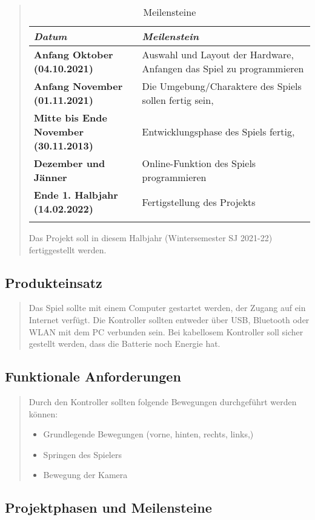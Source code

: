 \begin{quote}
\begin{longtable}[]{@{}ll@{}}

\emph{Datum} & \emph{Meilenstein}\tabularnewline

\endhead

\textbf{Anfang Oktober (04.10.2021)} & Auswahl und Layout der Hardware,
Anfangen das Spiel zu programmieren\tabularnewline
\textbf{Anfang November (01.11.2021)} & Die Umgebung/Charaktere des
Spiels sollen fertig sein,\tabularnewline
\textbf{Mitte bis Ende November (30.11.2013)} & Entwicklungsphase des
Spiels fertig,\tabularnewline
\textbf{Dezember und Jänner} & Online-Funktion des Spiels
programmieren\tabularnewline
\textbf{Ende 1. Halbjahr (14.02.2022)} & Fertigstellung des
Projekts\tabularnewline

\caption{Meilensteine}

\end{longtable}

Das Projekt soll in diesem Halbjahr (Wintersemester SJ 2021-22)
fertiggestellt werden.

\end{quote}

\hypertarget{produkteinsatz}{%
\subsection{Produkteinsatz}\label{produkteinsatz}}
\begin{quote}
Das Spiel sollte mit einem Computer gestartet werden, der Zugang auf ein
Internet verfügt. Die Kontroller sollten entweder über USB, Bluetooth
oder WLAN mit dem PC verbunden sein. Bei kabellosem Kontroller soll
sicher gestellt werden, dass die Batterie noch Energie hat.
\end{quote}
\hypertarget{funktionale-anforderungen}{%
\subsection{Funktionale Anforderungen}\label{funktionale-anforderungen}}
\begin{quote}
Durch den Kontroller sollten folgende Bewegungen durchgeführt werden
können:

\begin{itemize}
\item
  Grundlegende Bewegungen (vorne, hinten, rechts, links,)
\item
  Springen des Spielers
\item
  Bewegung der Kamera
\end{itemize}
\end{quote}
\hypertarget{projektphasen-und-meilensteine}{%
\subsection{Projektphasen und
Meilensteine}\label{projektphasen-und-meilensteine}}
 
